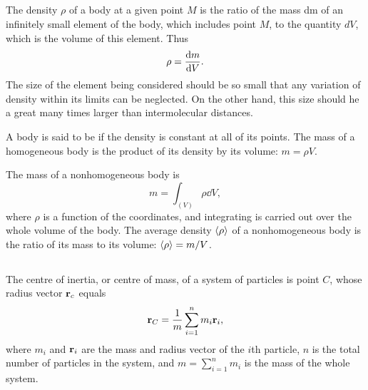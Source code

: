 \subsection{}\label{2.3.2} The density $\rho$ of a body at a given point $M$ is the ratio of the mass dm of an infinitely small element of the body, which includes point $M$, to the quantity $dV$, which is the volume of this element. Thus
\begin{equation*}%
\rho = \dv{m}{V}.
\end{equation*}
The size of the element being considered should be so small that any variation of density within its limits can be neglected. On the other hand, this size should he a great many times larger than intermolecular distances.

A body is said to be  if the density is constant at all of its points. The mass of a homogeneous body is the product of its density by its volume: $m = \rho V$.

The mass of a nonhomogeneous body is
\begin{equation*}%
m = \int_{(V)} \rho \dd V,
\end{equation*}
where $\rho$ is a function of the coordinates, and integrating is carried out over the whole volume of the body. The average den­sity $\expval{\rho}$ of a nonhomogeneous body is the ratio of its mass to its volume: $\expval{\rho} = m/V$.

\subsection{}\label{2.3.3} The centre of inertia, or centre of mass, of a system of par­ticles is point $C$, whose radius vector $\vb{r}_{c}$ equals
\begin{equation*}%
\vb{r}_{C} = \frac{1}{m} \sum_{i=1}^{n} m_{i} \vb{r}_{i},
\end{equation*}
where $m_{i}$ and $\vb{r}_{i}$ are the mass and radius vector of the $i$th par­ticle, $n$ is the total number of particles in the system, and $m = \sum_{i=1}^{n} m_{i}$ is the mass of the whole system.

